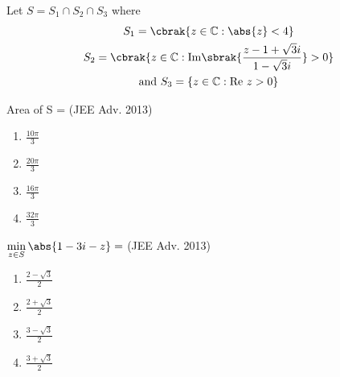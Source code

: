 \iffalse
\title{Assignment 1}
\author{AI24BTECH11031 - Shivram S}
\section{paragraph}
\fi

Let $S = S_1 \cap S_2 \cap S_3$ where
\begin{gather*}
	S_1 = \cbrak{z \in \mathbb C: \abs{z} < 4 } \\
	S_2 = \cbrak{z \in \mathbb C: \mathrm{Im} \sbrak{ \frac {z - 1 + \sqrt 3 i} {1 - \sqrt 3 i} } > 0 } \\
	\text{and} \ S_3 = \{z \in \mathbb C: \mathrm{Re}\ z > 0\}
\end{gather*}

		\setcounter{enumi}{3}
	\item Area of S = 
		\hfill (JEE Adv. 2013)

		\begin{multicols}{4}
			\begin{enumerate}
				\item $\frac {10\pi} {3}$ 
				\item $\frac {20\pi} {3}$
				\item $\frac {16\pi} {3}$
				\item $\frac {32\pi} {3}$
			\end{enumerate}
		\end{multicols}

	\item $\min\limits_{z \in S} \abs{1 - 3i - z} = $
		\hfill (JEE Adv. 2013)

		\begin{multicols}{2}
			\begin{enumerate}
				\item $\frac {2 - \sqrt{3}} {2}$
				\item $\frac {2 + \sqrt{3}} {2}$
				\item $\frac {3 -\sqrt{3}} {2}$
				\item $\frac {3 + \sqrt{3}} {2}$
			\end{enumerate}
		\end{multicols}

